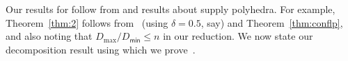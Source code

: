 %
Our results for \mckc follow from  and results about supply polyhedra.
For example, Theorem~\ref{thm:2} follows from~ (using $\delta=0.5$, say) and Theorem~\ref{thm:conflp}, and also noting that $D_\mathrm{max}/D_\mathsf{min} \leq n$ in our reduction. %
We now state our decomposition result using which we prove~. %
